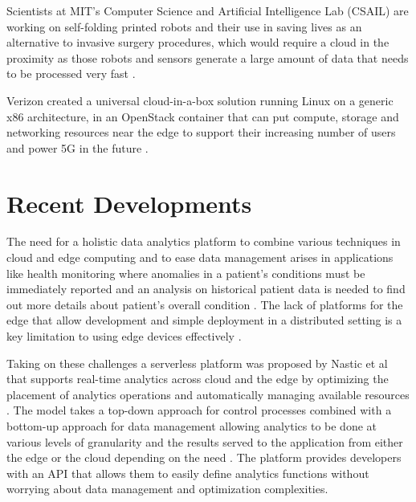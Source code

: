 \documentclass[sigconf]{acmart}
\begin{document}
Scientists at MIT's Computer Science and Artificial Intelligence Lab (CSAIL) are working on self-folding printed robots and their use in saving lives as an alternative to invasive surgery procedures, which would require a cloud in the proximity as those robots and sensors generate a large amount of data that needs to be processed very fast \cite{open-stack-living-on-edge}.

Verizon created a universal cloud-in-a-box solution running Linux on a generic x86 architecture, in an OpenStack container that can put compute, storage and networking resources near the edge to support their increasing number of users and power 5G in the future \cite{open-stack-living-on-edge}\cite{open-stack-verizon}.

\section{Recent Developments}
The need for a holistic data analytics platform to combine various techniques in cloud and edge computing and to ease data management arises in applications like health monitoring where anomalies in a patient's conditions must be immediately reported and an analysis on historical patient data is needed to find out more details about patient's overall condition \cite{ieee-serverless-platform-edge}. The lack of platforms for the edge that allow development and simple deployment in a distributed setting is a key limitation to using edge devices effectively \cite{ieee-iot-cloud-analytics-newsletter}.

Taking on these challenges a serverless platform was proposed by Nastic et al that supports real-time analytics across cloud and the edge by optimizing the placement of analytics operations and automatically managing available resources \cite{ieee-serverless-platform-edge}. The model takes a top-down approach for control processes combined with a bottom-up approach for data management allowing analytics to be done at various levels of granularity and the results served to the application from either the edge or the cloud depending on the need \cite{ieee-serverless-platform-edge}. The platform provides developers with an API that allows them to easily define analytics functions without worrying about data management and optimization complexities. 
\end{document}
